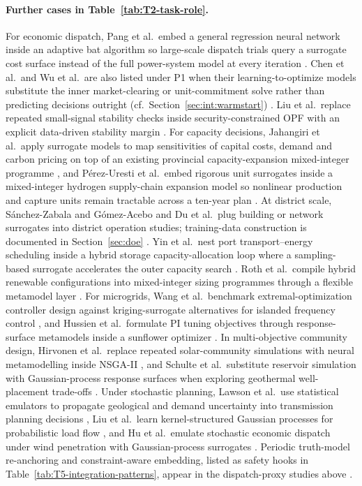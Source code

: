 \paragraph{Further cases in Table~\ref{tab:T2-task-role}.}
For economic dispatch, Pang et al.\ embed a general regression neural
network inside an adaptive bat algorithm so large-scale dispatch trials
query a surrogate cost surface instead of the full power-system model
at every iteration \cite{Pang2023}.
Chen et al.\ and Wu et al.\ are also listed under P1 when their
learning-to-optimize models substitute the inner market-clearing or
unit-commitment solve rather than predicting decisions outright
(cf.\ Section~\ref{sec:int:warmstart}) \cite{Chen20244723,Wu2022231}.
Liu et al.\ replace repeated small-signal stability checks inside
security-constrained OPF with an explicit data-driven stability margin
\cite{Liu20223726}.
For capacity decisions, Jahangiri et al.\ apply surrogate models to
map sensitivities of capital costs, demand and carbon pricing on top of
an existing provincial capacity-expansion mixed-integer programme
\cite{Jahangiri20244849}, and
P\'erez-Uresti et al.\ embed rigorous unit surrogates inside a
mixed-integer hydrogen supply-chain expansion model so nonlinear
production and capture units remain tractable across a ten-year plan
\cite{Pérez-Uresti2023}.
At district scale, S\'anchez-Zabala and G\'omez-Acebo and Du et al.\
plug building or network surrogates into district operation studies;
training-data construction is documented in Section~\ref{sec:doe}
\cite{Sánchez-Zabala2024,Du2025}.
Yin et al.\ nest port transport--energy scheduling inside a hybrid
storage capacity-allocation loop where a sampling-based surrogate
accelerates the outer capacity search \cite{Yin2024}.
Roth et al.\ compile hybrid renewable configurations into
mixed-integer sizing programmes through a flexible metamodel layer
\cite{Roth2019214}.
For microgrids, Wang et al.\ benchmark extremal-optimization controller
design against kriging-surrogate alternatives for islanded frequency
control \cite{Wang2017}, and Hussien et al.\ formulate PI tuning
objectives through response-surface metamodels inside a sunflower
optimizer \cite{Hussien20211883}.
In multi-objective community design, Hirvonen et al.\ replace repeated
solar-community simulations with neural metamodelling inside NSGA-II
\cite{Hirvonen2017323}, and Schulte et al.\ substitute reservoir
simulation with Gaussian-process response surfaces when exploring
geothermal well-placement trade-offs \cite{Schulte2020}.
Under stochastic planning, Lawson et al.\ use statistical emulators to
propagate geological and demand uncertainty into transmission planning
decisions \cite{Lawson201647}, Liu et al.\ learn kernel-structured
Gaussian processes for probabilistic load flow \cite{Liu20222679}, and
Hu et al.\ emulate stochastic economic dispatch under wind penetration
with Gaussian-process surrogates \cite{Hu2020}.
Periodic truth-model re-anchoring and constraint-aware embedding, listed
as safety hooks in Table~\ref{tab:T5-integration-patterns}, appear in
the dispatch-proxy studies above \cite{Wu2022231,Chen20244723,Chen2022}.


